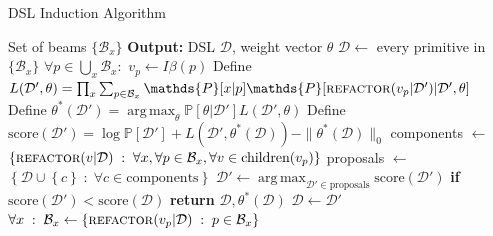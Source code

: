\documentclass{article}
\DeclareMathOperator*{\argmax}{arg\,max} %
\newcommand{\probability}{\mathds{P}} %
\begin{document}
\begin{algorithm}%
  \caption{DSL Induction Algorithm}
  \label{grammarInductionAlgorithm}
  \begin{algorithmic}[1]
     Set of beams $\{\mathcal{B}_x\}$
    \State \textbf{Output:} DSL $\mathcal{D}$, weight vector $\theta$
    \State $\mathcal{D}\gets$ every primitive in $\{\mathcal{B}_x\}$
    \State $\forall p\in \bigcup_{x}\mathcal{B}_x: $ $v_p\gets I\beta(p)$ 
    \State Define $L(\mathcal{D}',\theta) =  \prod_x \sum_{p\in \mathcal{B}_x} \probability[x|p]\probability[\text{\textsc{refactor}}(v_p|\mathcal{D}')|\mathcal{D}',\theta]$ 
    \State Define $\theta^*(\mathcal{D}') = \argmax_\theta \probability[\theta|\mathcal{D}'] L(\mathcal{D}',\theta)$ 
    \State Define $\text{score}(\mathcal{D}') = \log \probability[\mathcal{D}'] + L(\mathcal{D}',\theta^*(\mathcal{D})) - \|\theta^*(\mathcal{D})\|_0$ 
    \State components $\gets$ $\left\{\textsc{refactor}(v|\mathcal{D})\;:\;\forall x, \forall p\in \mathcal{B}_x, \forall v\in \text{children}(v_p) \right\}$ 
    \State proposals $\gets$ $\left\{\mathcal{D}\cup\left\{c \right\}\;:\;\forall c\in \text{components} \right\}$ 
    \State $\mathcal{D}'\gets \argmax_{\mathcal{D}'\in \text{proposals}}\text{score}(\mathcal{D}') $
    \State \textbf{if }$\text{score}(\mathcal{D}') < \text{score}(\mathcal{D})$\textbf{ return }$\mathcal{D},\theta^*(\mathcal{D})$
    \State $\mathcal{D}\gets\mathcal{D}'$ 
    \State $\forall x\;:\;\mathcal{B}_x\gets\left\{\text{\textsc{refactor}}(v_p|\mathcal{D})\;:\; p\in \mathcal{B}_x\right\}$
    \EndWhile
  \end{algorithmic}
\end{algorithm}
\end{document}
